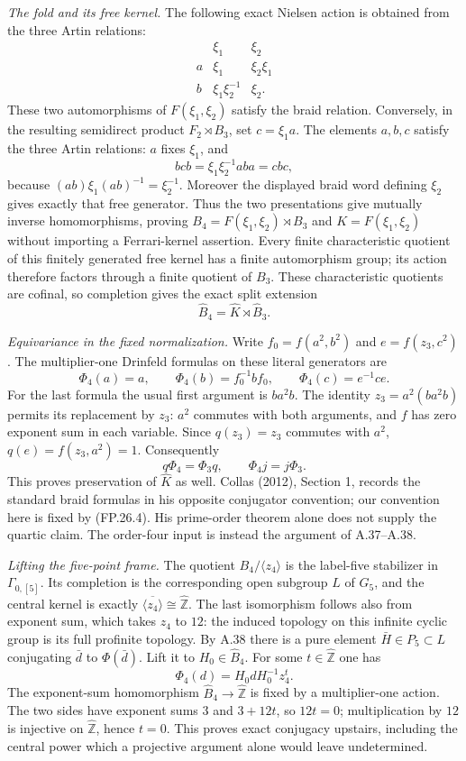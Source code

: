 \emph{The fold and its free kernel.}
The following exact Nielsen action is obtained from the three Artin
relations:
\[
 \begin{array}{c|cc}
 &\xi_1&\xi_2\\ \hline
 a&\xi_1&\xi_2\xi_1\\
 b&\xi_1\xi_2^{-1}&\xi_2.
 \end{array}
 \tag{FP.26.2}
\]
These two automorphisms of $F(\xi_1,\xi_2)$ satisfy the braid relation.
Conversely, in the resulting semidirect product $F_2\rtimes B_3$, set
$c=\xi_1a$. The elements $a,b,c$ satisfy the three Artin relations:
$a$ fixes $\xi_1$, and
\[
 bcb=\xi_1\xi_2^{-1}aba=cbc,
\]
because $(ab)\xi_1(ab)^{-1}=\xi_2^{-1}$.
Moreover the displayed braid word defining $\xi_2$ gives exactly that
free generator. Thus the two presentations give mutually inverse
homomorphisms, proving $B_4=F(\xi_1,\xi_2)\rtimes B_3$ and
$K=F(\xi_1,\xi_2)$ without importing a Ferrari-kernel assertion.
Every finite characteristic quotient of this finitely generated free
kernel has a finite automorphism group; its action therefore factors
through a finite quotient of $B_3$. These characteristic quotients are
cofinal, so completion gives the exact split extension
\[
 \widehat B_4=\widehat K\rtimes\widehat B_3.
 \tag{FP.26.3}
\]

\emph{Equivariance in the fixed normalization.}
Write $f_0=f(a^2,b^2)$ and $e=f(z_3,c^2)$. The multiplier-one
Drinfeld formulas on these literal generators are
\[
 \Phi_4(a)=a,\qquad
 \Phi_4(b)=f_0^{-1}bf_0,\qquad
 \Phi_4(c)=e^{-1}ce.
 \tag{FP.26.4}
\]
For the last formula the usual first argument is $ba^2b$.
The identity $z_3=a^2(ba^2b)$ permits its replacement by $z_3$:
$a^2$ commutes with both arguments, and $f$ has zero exponent sum in
each variable. Since $q(z_3)=z_3$ commutes with $a^2$,
$q(e)=f(z_3,a^2)=1$. Consequently
\[
 q\Phi_4=\Phi_3q,\qquad \Phi_4j=j\Phi_3.
 \tag{FP.26.5}
\]
This proves preservation of $\widehat K$ as well. Collas (2012),
Section 1, records the standard braid formulas in his opposite
conjugator convention; our convention here is fixed by (FP.26.4).
His prime-order theorem alone does not supply the quartic claim.
The order-four input is instead the argument of A.37--A.38.

\emph{Lifting the five-point frame.}
The quotient $B_4/\langle z_4\rangle$ is the label-five stabilizer in
$\Gamma_{0,[5]}$. Its completion is the corresponding open subgroup
$L$ of $G_5$, and the central kernel is exactly
$\overline{\langle z_4\rangle}\cong\widehat{\mathbb Z}$.
The last isomorphism follows also from exponent sum, which takes
$z_4$ to $12$: the induced topology on this infinite cyclic group is
its full profinite topology. By A.38 there is a pure element
$\bar H\in P_5\subset L$ conjugating $\bar d$ to
$\Phi(\bar d)$. Lift it to $H_0\in\widehat B_4$. For some
$t\in\widehat{\mathbb Z}$ one has
\[
 \Phi_4(d)=H_0dH_0^{-1}z_4^t.
\]
The exponent-sum homomorphism $\widehat B_4\to\widehat{\mathbb Z}$
is fixed by a multiplier-one action. The two sides have exponent sums
$3$ and $3+12t$, so $12t=0$; multiplication by $12$ is injective on
$\widehat{\mathbb Z}$, hence $t=0$. This proves exact conjugacy
upstairs, including the central power which a projective argument alone
would leave undetermined.

